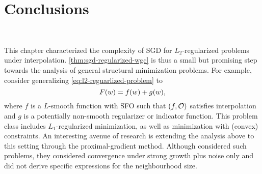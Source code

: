 \section{Conclusions}~\label{sec:beyond-interp-conclusions}

This chapter characterized the complexity of \ac{SGD} for \( L_2 \)-regularized problems under interpolation.
\autoref{thm:sgd-regularized-wgc} is thus a small but promising step towards the analysis of general structural minimization problems.
For example, consider generalizing \autoref{eq:l2-reguarlized-problem} to 
\[ F(\w) = f(\w) + g(\w), \]
where \( f \) is a \( L \)-smooth function with \ac{SFO} \oracle{} such that \( \rbr{f, \oracle{}} \) satisfies interpolation and \( g \) is a potentially non-smooth regularizer or indicator function. 
This problem class includes \( L_1 \)-regularized minimization, as well as minimization with (convex) constraints.
An interesting avenue of research is extending the analysis above to this setting through the proximal-gradient method.
Although \citet{cevher2018linear} considered such problems, they considered convergence under strong growth plus noise only and did not derive specific expressions for the neighbourhood size.

